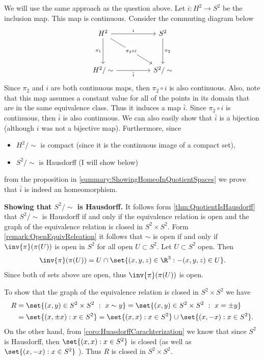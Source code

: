 \begin{solution}
	We will use the same approach as the question above. Let $ i: H^2 \to S^2 $ be the inclusion map. This map is continuous. Consider the commuting diagram below
	\[\begin{tikzcd}
		{H^2} && {S^2} \\
		\\
		{H^2/\sim} && {S^2/\sim}
		\arrow["i", from=1-1, to=1-3]
		\arrow["{\pi_1}"', from=1-1, to=3-1]
		\arrow["{\pi_2\circ i}"{description}, from=1-1, to=3-3]
		\arrow["{\pi_2}", from=1-3, to=3-3]
		\arrow["{\bar{i}}"', from=3-1, to=3-3]
	\end{tikzcd}\]
	Since $ \pi_2 $ and $ i $ are both continuous maps, then $ \pi_2\circ i $ is also continuous. Also, note that this map assumes a constant value for all of the points in its domain that are in the same equivalence class. Thus it induces a map $ \bar{i} $. Since $ \pi_2\circ i $ is continuous, then $ \bar{i} $ is also continuous. We can also easily show that $ \bar{i} $ is a bijection (although $ i $ was not a bijective map). Furthermore, since 
	\begin{itemize}[noitemsep]
		\item $ H^2/\sim $ is compact (since it is the continuous image of a compact set),
		\item $ S^2/\sim $ is Hausdorff (I will show below)
	\end{itemize}
	from the proposition in \autoref{summary:ShowingHomeoInQuotientSpaces} we prove that $ \bar{i} $ is indeed an homeomorphism.
	
	\noindent \textbf{Showing that $ S^2/\sim $ is Hausdorff. } It follows form \autoref{thm:QuotientIsHausdorff} that $ S^2/\sim $ is Hausdorff if and only if the equivalence relation is open and the graph of the equivalence relation is closed in $ S^2\times S^2 $. Form \autoref{remark:OpenEquivReleation} it follows that $ \sim $ is open if and only if $ \inv{\pi}(\pi(U)) $ is open in $ S^2 $ for all open $ U \subset S^2 $. Let $ U\subset S^2 $ open. Then 
	\[ \inv{\pi}(\pi(U)) = U \cap \set{(x,y,z)\in \R^3: -(x,y,z) \in U}. \]
	Since both of sets above are open, thus $ \inv{\pi}(\pi(U)) $ is open.
	
	\noindent To show that the graph of the equivalence relation is closed in $ S^2 \times S^2 $ we have
	\begin{align*}
		R &= \set{ (x,y)\in S^2\times S^2\ :\ x\sim y } = \set{ (x,y)\in S^2\times S^2\ :\ x= \pm y } \\
		&= \set{ (x,\pm x): x \in S^2} = \set{ (x,x): x \in S^2}\cup \set{ (x,-x): x \in S^2}.
	\end{align*}
	On the other hand, from \autoref{coro:HuasdorffCarachterization} we know that since $ S^2 $ is Hausdorff, then $ \set{ (x,x): x \in S^2} $ is closed (as well as $ \set{ (x,-x): x \in S^2} $ ). Thus $ R $ is closed in $ S^2\times S^2 $.
\end{solution}



